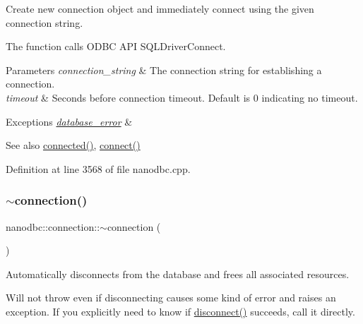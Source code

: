 Create new connection object and immediately connect using the given connection string. 

The function calls O\+D\+BC A\+PI S\+Q\+L\+Driver\+Connect.


\begin{DoxyParams}{Parameters}
{\em connection\+\_\+string} & The connection string for establishing a connection. \\
\hline
{\em timeout} & Seconds before connection timeout. Default is 0 indicating no timeout. \\
\hline
\end{DoxyParams}

\begin{DoxyExceptions}{Exceptions}
{\em \mbox{\hyperlink{classnanodbc_1_1database__error}{database\+\_\+error}}} & \\
\hline
\end{DoxyExceptions}
\begin{DoxySeeAlso}{See also}
\mbox{\hyperlink{classnanodbc_1_1connection_a703da57a7ce3c572f472132ba49a1114}{connected()}}, \mbox{\hyperlink{classnanodbc_1_1connection_a480deb30989b18cad0394980fb181da7}{connect()}} 
\end{DoxySeeAlso}


Definition at line 3568 of file nanodbc.\+cpp.

\mbox{\label{classnanodbc_1_1connection_a115b960ed491c9db46430ff90f58606d}} 
\subsubsection{\texorpdfstring{$\sim$connection()}{~connection()}}
{\footnotesize\ttfamily nanodbc\+::connection\+::$\sim$connection (\begin{DoxyParamCaption}{ }\end{DoxyParamCaption})\hspace{0.3cm}{\ttfamily [noexcept]}}



Automatically disconnects from the database and frees all associated resources. 

Will not throw even if disconnecting causes some kind of error and raises an exception. If you explicitly need to know if \mbox{\hyperlink{classnanodbc_1_1connection_adf614b7fdc08596122ca12e21a61ba34}{disconnect()}} succeeds, call it directly. 


